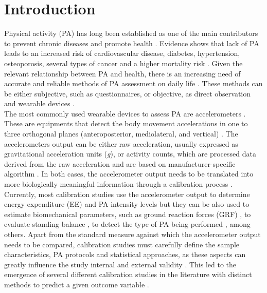 \documentclass[11pt]{article}
\begin{document}
\section*{Introduction}

Physical activity (PA) has long been established as one of the main contributors to prevent chronic diseases and promote health \cite{Kaminsky_2014, Warburton_2017}. Evidence shows that lack of PA leads to an increased risk of cardiovascular disease, diabetes, hypertension, osteoporosis, several types of cancer and a higher mortality risk \cite{Guthold_2018, Lee_2012, Shiroma_2014}. Given the relevant relationship between PA and health, there is an increasing need of accurate and reliable methods of PA assessment on daily life \cite{Montoye_2000, Plasqui_2013, Strath_2013}. These methods can be either subjective, such as questionnaires, or objective, as direct observation and wearable devices \cite{Strath_2013, Troiano_2005}. \\

The most commonly used wearable devices to assess PA are accelerometers \cite{Strath_2013}. These are equipments that detect the body movement accelerations in one to three orthogonal planes (anteroposterior, mediolateral, and vertical) \cite{Chen_2005}. The accelerometers output can be either raw acceleration, usually expressed as gravitational acceleration units (\textit{g}), or activity counts, which are processed data derived from the raw acceleration and are based on manufacturer-specific algorithm \cite{Chen_2005, Basset_2012, Troiano_2014}. In both cases, the accelerometer output needs to be translated into more biologically meaningful information through a calibration process \cite{Matthews_2005}. \\

Currently, most calibration studies use the accelerometer output to determine energy expenditure (EE) and PA intensity levels \cite{Migueles_2017, Mendes_2018} but they can be also used to estimate biomechanical parameters, such as ground reaction forces (GRF) \cite{Neugebauer_2014, Fortune_2014}, to evaluate standing balance \cite{Mayagoitia_2002}, to detect the type of PA being performed \cite{Bonomi_2009, Zhang_2012}, among others. Apart from the standard measure against which the accelerometer output needs to be compared, calibration studies must carefully define the sample characteristics, PA protocols and statistical approaches, as these aspects can greatly influence the study internal and external validity \cite{Basset_2012, Welk_2005}. This led to the emergence of several different calibration studies in the literature with distinct methods to predict a given outcome variable \cite{Mendes_2018, Matthews_2018}. \\
\end{document}
